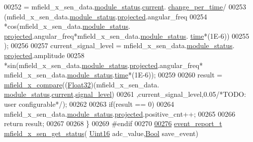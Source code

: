 \begin{DoxyCode}
00252               = mfield\_x\_sen\_data.\hyperlink{a00025_adfab5a5d8b45a93dfb13edb24e2b80e3}{module\_status}.\hyperlink{a00019_acf41ffc11da291c2f9f0fcb02ee72b98}{current}.
      \hyperlink{a00019_a0f645dd76b41adc6a966feba8e4bff8c}{change\_per\_time}/
00253                      (mfield\_x\_sen\_data.\hyperlink{a00025_adfab5a5d8b45a93dfb13edb24e2b80e3}{module\_status}.\hyperlink{a00019_af2267fb093fb5dcaa006a570a6da3b6b}{projected}.angular\_freq
00254                       *cos(mfield\_x\_sen\_data.\hyperlink{a00025_adfab5a5d8b45a93dfb13edb24e2b80e3}{module\_status}.
      \hyperlink{a00019_af2267fb093fb5dcaa006a570a6da3b6b}{projected}.angular\_freq*mfield\_x\_sen\_data.\hyperlink{a00025_adfab5a5d8b45a93dfb13edb24e2b80e3}{module\_status}.
      \hyperlink{a00019_ad496f33595a12b00015d6778e594321c}{time}*(1E-6))
00255                       );
00256 
00257              current\_signal\_level = mfield\_x\_sen\_data.\hyperlink{a00025_adfab5a5d8b45a93dfb13edb24e2b80e3}{module\_status}.
      \hyperlink{a00019_af2267fb093fb5dcaa006a570a6da3b6b}{projected}.amplitude
00258                *sin(mfield\_x\_sen\_data.\hyperlink{a00025_adfab5a5d8b45a93dfb13edb24e2b80e3}{module\_status}.\hyperlink{a00019_af2267fb093fb5dcaa006a570a6da3b6b}{projected}.angular\_freq*
      mfield\_x\_sen\_data.\hyperlink{a00025_adfab5a5d8b45a93dfb13edb24e2b80e3}{module\_status}.\hyperlink{a00019_ad496f33595a12b00015d6778e594321c}{time}*(1E-6));
00259 
00260           result =  \hyperlink{a00050_adf290c10214480d55f3631c1760188b0}{mfield\_x\_compare}((\hyperlink{a00072_a87d38f886e617ced2698fc55afa07637}{Float32})(mfield\_x\_sen\_data.
      \hyperlink{a00025_adfab5a5d8b45a93dfb13edb24e2b80e3}{module\_status}.\hyperlink{a00019_acf41ffc11da291c2f9f0fcb02ee72b98}{current}.\hyperlink{a00019_a4070db8eab0ff93e3fbc1df59872f117}{signal\_level})
00261                   ,current\_signal\_level,0.05\textcolor{comment}{/*TODO: user configurable*/});
00262 
00263           \textcolor{keywordflow}{if}(result == 0)
00264               mfield\_x\_sen\_data.\hyperlink{a00025_adfab5a5d8b45a93dfb13edb24e2b80e3}{module\_status}.\hyperlink{a00019_af2267fb093fb5dcaa006a570a6da3b6b}{projected}.positive\_cnt++;
00265 
00266           \textcolor{keywordflow}{return} result;
00267 
00268 \}
00269 \textcolor{preprocessor}{#endif}
00270 
\hypertarget{a00050_source_l00276}{}\hyperlink{a00050_a3a46d0e69b27b3566e6d8465cf7a8b0a}{00276} \hyperlink{a00021_d6/d66/a00441}{event\_report\_t} \hyperlink{a00050_a3a46d0e69b27b3566e6d8465cf7a8b0a}{mfield\_x\_sen\_get\_status}(
      \hyperlink{a00072_a59a9f6be4562c327cbfb4f7e8e18f08b}{Uint16} adc\_value,\hyperlink{a00072_a253b248072cfc8bd812c69acd0046eed}{Bool} save\_event)

\end{DoxyCode}
